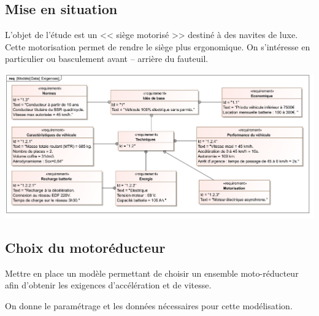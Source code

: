 \documentclass[10pt,fleqn]{article} %
\begin{document}

\vspace{4.5cm}
\pagestyle{fancy}
\thispagestyle{plain}


\def\columnseprulecolor{\color{ocre}}
\setlength{\columnseprule}{0.4pt} 

\begin{multicols}{2}
\section*{Mise en situation}
\ifprof
\else
\fi

L'objet de l'étude est un << siège motorisé >> destiné à des navites de luxe. Cette motorisation permet de rendre le siège plus ergonomique. On s'intéresse en particulier ou basculement avant -- arrière du fauteuil.

\begin{center}
\includegraphics[width=\linewidth]{images/Exigences}
\end{center}

\subsection*{Choix du motoréducteur}


\begin{obj}
Mettre en place un modèle permettant de choisir un ensemble moto-réducteur afin d’obtenir les
exigences d’accélération et de vitesse.
\end{obj}

On donne le paramétrage et les données nécessaires pour cette modélisation.



\end{multicols}
\end{document}
